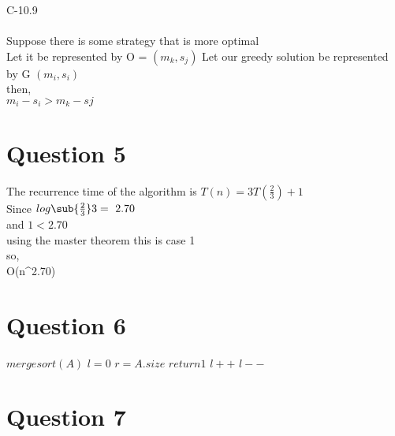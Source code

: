 \documentclass{article}
\begin{document}
C-10.9 \\
\\
Suppose there is some strategy that is more optimal\\
Let it be represented by O = $(m_{k}, s_{j})$
Let our greedy solution be represented by G $(m_{i}, s_{i})$\\
then, \\
$m_{i} - s_{i} > m_{k} - s{j}$\\




\section*{Question 5}

The recurrence time of the algorithm is $T(n) = 3T(\frac{2}{3}) + 1$\\
Since $log\sub{\frac{2}{3}}3 = ~ 2.70$\\
and $1 < 2.70$\\
using the master theorem this is case 1\\
so,\\
O(n^{2.70})

\section*{Question 6}

\begin{algorithmic}
  \STATE$mergesort(A)$
  \STATE$l = 0$
  \STATE$r = A.size$
  \STATE$return 1$
  \STATE$l++$
  \ELSE
  \STATE$l--$
  \ENDWHILE


\end{algorithmic}

\section*{Question 7}
\end{document}
